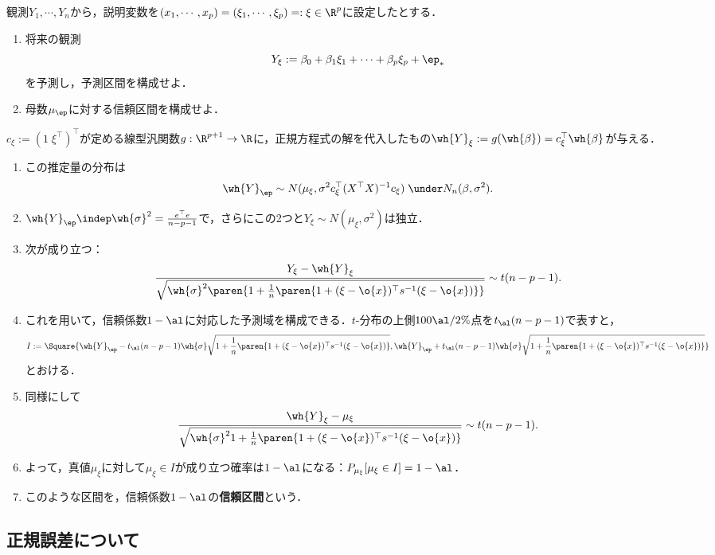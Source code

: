 \documentclass[uplatex,dvipdfmx]{jsreport}
\begin{document}
\begin{problem}
    観測$Y_1,\cdots,Y_n$から，説明変数を$(x_1,\cdots,x_p)=(\xi_1,\cdots,\xi_p)=:\xi\in\R^p$に設定したとする．
    \begin{enumerate}
        \item 将来の観測
        \[Y_\xi:=\beta_0+\beta_1\xi_1+\cdots+\beta_p\xi_p+\ep_*\]
        を予測し，予測区間を構成せよ．
        \item 母数$\mu_\ep$に対する信頼区間を構成せよ．
    \end{enumerate}
\end{problem}
\begin{solution}
    $c_\xi:=(1\;\xi^\top)^\top$が定める線型汎関数$g:\R^{p+1}\to\R$に，正規方程式の解を代入したもの$\wh{Y}_\xi:=g(\wh{\beta})=c^\top_\xi\wh{\beta}$が与える．
    \begin{enumerate}
        \item この推定量の分布は
        \[\wh{Y}_\ep\sim N(\mu_\xi,\sigma^2c^\top_\xi(X^\top X)^{-1}c_\xi)\;\under N_n(\beta,\sigma^2).\]
        \item $\wh{Y}_\ep\indep\wh{\sigma}^2=\frac{e^\top e}{n-p-1}$で，さらにこの2つと$Y_\xi\sim N(\mu_\xi,\sigma^2)$は独立．
        \item 次が成り立つ：
        \[\frac{Y_\xi-\wh{Y}_\xi}{\sqrt{\wh{\sigma}^2\paren{1+\frac{1}{n}\paren{1+(\xi-\o{x})^\top s^{-1}(\xi-\o{x})}}}}\sim t(n-p-1).\]
        \item これを用いて，信頼係数$1-\al$に対応した予測域を構成できる．$t$-分布の上側$100\al/2\%$点を$t_\al(n-p-1)$で表すと，
        \[I:=\Square{\wh{Y}_\ep-t_\al(n-p-1)\wh{\sigma}\sqrt{1+\frac{1}{n}\paren{1+(\xi-\o{x})^\top s^{-1}(\xi-\o{x})}},\wh{Y}_\ep+t_\al(n-p-1)\wh{\sigma}\sqrt{1+\frac{1}{n}\paren{1+(\xi-\o{x})^\top s^{-1}(\xi-\o{x})}}}\]
        とおける．
        \item 同様にして
        \[\frac{\wh{Y}_\xi-\mu_\xi}{\sqrt{\wh{\sigma}^21+\frac{1}{n}\paren{1+(\xi-\o{x})^\top s^{-1}(\xi-\o{x})}}}\sim t(n-p-1).\]
        \item よって，真値$\mu_\xi$に対して$\mu_\xi\in I$が成り立つ確率は$1-\al$になる：$P_{\mu_\xi}[\mu_\xi\in I]=1-\al$．
        \item このような区間を，信頼係数$1-\al$の\textbf{信頼区間}という．
    \end{enumerate}
\end{solution}

\subsection{正規誤差について}
\end{document}
